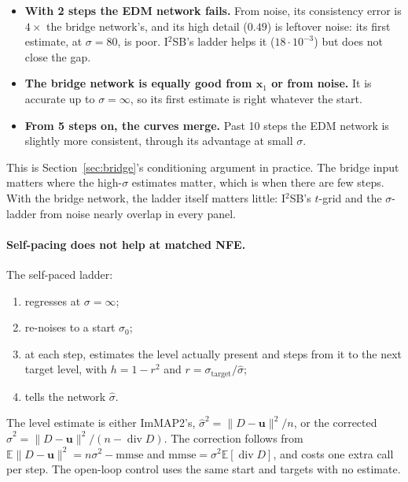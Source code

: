 \documentclass[11pt]{article}
\theoremstyle{remark}
\newcommand{\x}{\bm{x}}
\newcommand{\uu}{\bm{u}}
\newcommand{\E}{\mathbb{E}}
\begin{document}
\begin{itemize}[leftmargin=1.5em, itemsep=1pt]
  \item \textbf{With 2 steps the EDM network fails.} From noise, its consistency error is
        $4\times$ the bridge network's, and its high detail ($0.49$) is leftover noise: its first
        estimate, at $\sigma=80$, is poor. I$^2$SB's ladder helps it ($18\cdot10^{-3}$) but does
        not close the gap.
  \item \textbf{The bridge network is equally good from $\x_1$ or from noise.} It is accurate up to
        $\sigma=\infty$, so its first estimate is right whatever the start.
  \item \textbf{From 5 steps on, the curves merge.} Past 10 steps the EDM network is slightly
        more consistent, through its advantage at small $\sigma$.
\end{itemize}
This is Section~\ref{sec:bridge}'s conditioning argument in practice. The bridge input matters
where the high-$\sigma$ estimates matter, which is when there are few steps. With the bridge
network, the ladder itself matters little: I$^2$SB's $t$-grid and the $\sigma$-ladder from noise
nearly overlap in every panel.

\paragraph{Self-pacing does not help at matched NFE.} The self-paced ladder:
\begin{enumerate}[leftmargin=1.5em, itemsep=1pt]
  \item regresses at $\sigma=\infty$;
  \item re-noises to a start $\sigma_0$;
  \item at each step, estimates the level actually present and steps from it to the next
        target level, with $h=1-r^2$ and $r = \sigma_{\mathrm{target}}/\hat\sigma$;
  \item tells the network $\hat\sigma$.
\end{enumerate}
The level estimate is either ImMAP2's, $\hat\sigma^2 = \|D-\uu\|^2/n$, or the corrected
$\hat\sigma^2 = \|D-\uu\|^2/(n-\operatorname{div}D)$. The correction follows from
$\E\|D-\uu\|^2 = n\sigma^2-\mathrm{mmse}$ and $\mathrm{mmse} = \sigma^2\E[\operatorname{div}D]$,
and costs one extra call per step. The open-loop control uses the same start and targets with no
estimate.
\end{document}
